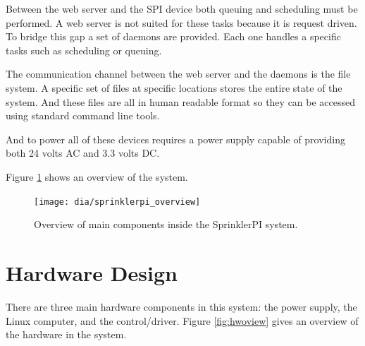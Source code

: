 \documentclass{article}
\begin{document}
Between the web server and the SPI device both queuing and scheduling
must be performed.
A web server is not suited for these tasks because it is request driven.
To bridge this gap a set of daemons are provided.
Each one handles a specific tasks such as scheduling or queuing.

The communication channel between the web server and the daemons is the
file system.
A specific set of files at specific locations stores the entire state
of the system.
And these files are all in human readable format so they
can be accessed using standard command line tools.

And to power all of these devices requires a power supply capable
of providing both 24 volts AC and 3.3 volts DC.

Figure \ref{fig:spioview} shows an overview of the system.

\begin{figure}[h!]
\begin{center}
\texttt{[image: dia/sprinklerpi\_overview]}
\end{center}
\caption{Overview of main components inside the SprinklerPI system.}
\label{fig:spioview}
\end{figure}


\clearpage
\section{Hardware Design}
\label{sec:hardware}

There are three main hardware components in this system:
the power supply, the Linux computer, and the control/driver.
Figure \ref{fig:hwoview} gives an overview of the hardware in the system.
\end{document}

